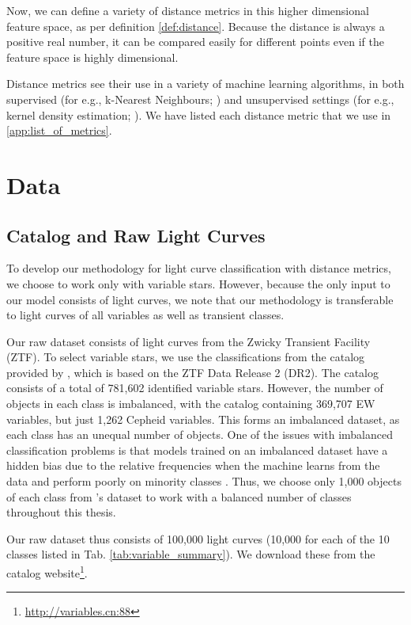 \documentclass[conference]{IEEEtran}
\begin{document}
Now, we can define a variety of distance metrics in this higher dimensional feature space, as per definition \ref{def:distance}. Because the distance is always a positive real number, it can be compared easily for different points even if the feature space is highly dimensional.

Distance metrics see their use in a variety of machine learning algorithms, in both supervised (for e.g., k-Nearest Neighbours; \cite{abualfeilatEffectsDistanceMeasure2019}) and unsupervised settings (for e.g., kernel density estimation; \cite{heKernelDensityMetric2013}). We have listed each distance metric that we use in \ref{app:list_of_metrics}.

\section{Data} \label{sec:data}
\subsection{Catalog and Raw Light Curves} \label{subsec:catalog}
To develop our methodology for light curve classification with distance metrics, we choose to work only with variable stars. However, because the only input to our model consists of light curves, we note that our methodology is transferable to light curves of all variables as well as transient classes.

Our raw dataset consists of light curves from the Zwicky Transient Facility (ZTF). To select variable stars, we use the classifications from the catalog provided by \cite{chenZwickyTransientFacility2020a}, which is based on the ZTF Data Release 2 (DR2). The catalog consists of a total of 781,602 identified variable stars. However, the number of objects in each class is imbalanced, with the catalog containing 369,707 EW variables, but just 1,262 Cepheid variables. This forms an imbalanced dataset, as each class has an unequal number of objects. One of the issues with imbalanced classification problems is that models trained on an imbalanced dataset have a hidden bias due to the relative frequencies when the machine learns from the data and perform poorly on minority classes \cite{krawczykLearningImbalancedData2016}. Thus, we choose only 1,000 objects of each class from \cite{chenZwickyTransientFacility2020a}'s dataset to work with a balanced number of classes throughout this thesis.

Our raw dataset thus consists of 100,000 light curves (10,000 for each of the 10 classes listed in Tab. \ref{tab:variable_summary}). We download these from the catalog website\footnote{\href{http://variables.cn:88}{http://variables.cn:88}}.
\end{document}
